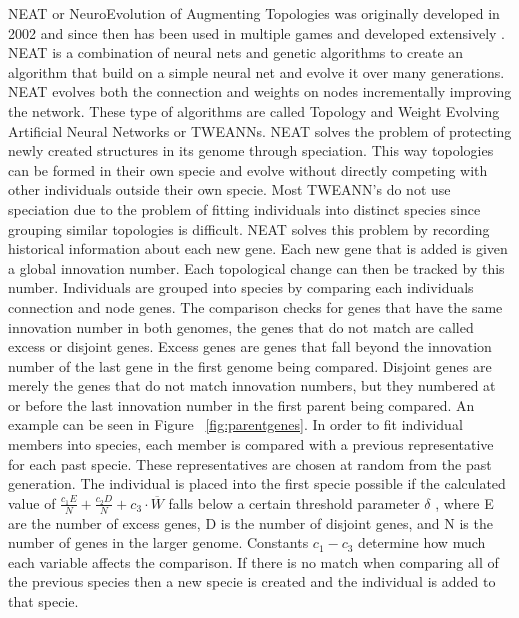 \documentclass[12pt]{ucthesis} \newif\ifpdf \ifx\pdfoutput\undefined
\begin{document}
NEAT or NeuroEvolution of Augmenting Topologies  was originally developed in
2002 and since then has been used in multiple games and developed extensively
\cite{stanley:phd04}. NEAT is a combination of neural nets and genetic
algorithms to create an algorithm that build on a simple neural net and evolve it over many
generations. NEAT evolves both the connection and weights on nodes incrementally
improving the network. These type of algorithms are called Topology and Weight
Evolving Artiﬁcial Neural Networks or TWEANNs. NEAT solves the problem of
protecting newly created structures in its genome through speciation. This way
topologies can be formed in their own specie and evolve without directly
competing with other individuals outside their own specie. Most TWEANN’s do not
use speciation due to the problem of fitting individuals into distinct species
since grouping similar topologies is difficult. NEAT solves this problem by
recording historical information about each new gene. Each new gene that is
added is given a global innovation number. Each topological change can then be
tracked by this number. Individuals are grouped into species by comparing each
individuals connection and node genes. The comparison checks for genes that have
the same innovation number in both genomes, the genes that do not match are
called excess or disjoint genes. Excess genes are genes that fall beyond the
innovation number of the last gene in the first genome being compared. Disjoint
genes are merely the genes that do not match innovation numbers, but they
numbered at or before the last innovation number in the first parent being
compared. An example can be seen in  Figure ~\ref{fig:parentgenes}. In order to fit
individual members into species, each member is compared with a previous
representative for each past specie. These representatives are chosen at random
from the past generation. The individual is placed into the first specie
possible if the calculated value of $\frac{c_{1}E}{N} + \frac{c_{2}D}{N} + c_{3}
\cdot \overline{W}$ falls below a certain threshold parameter $\delta$ , where E are
the number of excess genes, D is the number of disjoint genes, and N is the
number of genes in the larger genome. Constants $c_{1} - c_{3}$ determine how
much each variable affects the comparison. If there is no match when comparing all of the previous species then a new specie is created and the individual is added to that specie.
\end{document}
